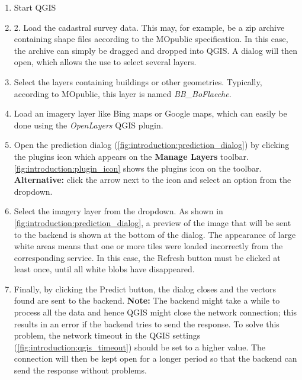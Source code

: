 \begin{enumerate}
    \item Start QGIS
    \item 2.	Load the cadastral survey data. This may, for example, be a zip archive containing shape files according to the MOpublic \cite{mopublic}  specification. In this case, the archive can simply be dragged and dropped into QGIS. A dialog will then open, which allows the use to select several layers.
    \item Select the layers containing buildings or other geometries. Typically, according to MOpublic, this layer is named \textit{BB\_BoFlaeche}.
    
    \item Load an imagery layer like Bing maps or Google maps, which can easily be done using the \textit{OpenLayers} QGIS plugin.
    
    \item Open the prediction dialog (\autoref{fig:introduction:prediction_dialog}) by clicking the plugins icon which appears on the \textbf{Manage Layers} toolbar. \autoref{fig:introduction:plugin_icon} shows the plugins icon on the toolbar. \textbf{Alternative:} click the arrow next to the icon and select an option from the dropdown.
    
    \item Select the imagery layer from the dropdown. As shown in \autoref{fig:introduction:prediction_dialog}, a preview of the image that will be sent to the backend is shown at the bottom of the dialog. The appearance of large white areas means that one or more tiles were loaded incorrectly from the corresponding service. In this case, the Refresh button must be clicked at least once, until all white blobs have disappeared.
    
    \item Finally, by clicking the Predict button, the dialog closes and the vectors found are sent to the backend. \textbf{Note:} The backend might take a while to process all the data and hence QGIS might close the network connection; this results in an error if the backend tries to send the response. To solve this problem, the network timeout in the QGIS settings (\autoref{fig:introduction:qgis_timeout}) should be set to a higher value. The connection will then be kept open for a longer period so that the backend can send the response without problems.
\end{enumerate}


